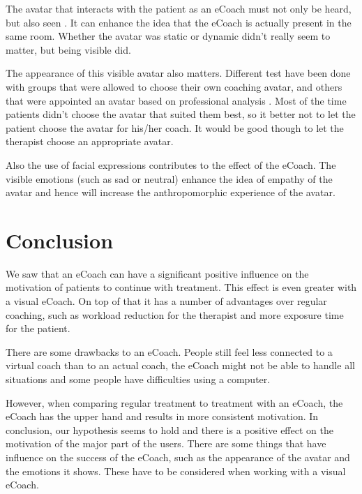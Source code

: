 \documentclass[twoside]{article}
\begin{document}
\begin{multicols}{2}
The avatar that interacts with the patient as an eCoach must not only be heard, but also seen \cite{baylor2009promoting}. It can enhance the idea that the eCoach is actually present in the same room. Whether the avatar was static or dynamic didn't really seem to matter, but being visible did.

The appearance of this visible avatar also matters. Different test have been done with groups that were allowed to choose their own coaching avatar, and others that were appointed an avatar based on professional analysis \cite{baylor2009promoting}. Most of the time patients didn't choose the avatar that suited them best, so it better not to let the patient choose the avatar for his/her coach. It would be good though to let the therapist choose an appropriate avatar.

Also the use of facial expressions contributes to the effect of the eCoach. The visible emotions (such as sad or neutral) enhance the idea of empathy of the avatar \cite{blanson2009online} and hence will increase the anthropomorphic experience of the avatar.


\section{Conclusion}
We saw that an eCoach can have a significant positive influence on the motivation of patients to continue with treatment. This effect is even greater with a visual eCoach. On top of that it has a number of advantages over regular coaching, such as workload reduction for the therapist and more exposure time for the patient.

There are some drawbacks to an eCoach. People still feel less connected to a virtual coach than to an actual coach, the eCoach might not be able to handle all situations and some people have difficulties using a computer.

However, when comparing regular treatment to treatment with an eCoach, the eCoach has the upper hand and results in more consistent motivation. In conclusion, our hypothesis seems to hold and there is a positive effect on the motivation of the major part of the users. There are some things that have influence on the success of the eCoach, such as the appearance of the avatar and the emotions it shows. These have to be considered when working with a visual eCoach.



\end{multicols}
\end{document}
